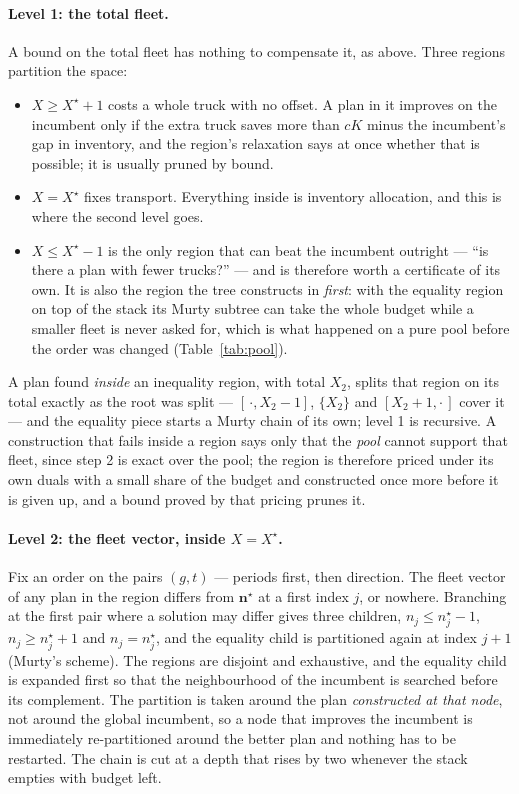 \paragraph{Level 1: the total fleet.}
A bound on the total fleet has nothing to compensate it, as above.
Three regions partition the space:
\begin{itemize}
\item $X\ge X^{\star}+1$ costs a whole truck with no offset. A plan in
  it improves on the incumbent only if the extra truck saves more than
  $cK$ minus the incumbent's gap in inventory, and the region's
  relaxation says at once whether that is possible; it is usually
  pruned by bound.
\item $X=X^{\star}$ fixes transport. Everything inside is inventory
  allocation, and this is where the second level goes.
\item $X\le X^{\star}-1$ is the only region that can beat the incumbent
  outright --- ``is there a plan with fewer trucks?'' --- and is
  therefore worth a certificate of its own. It is also the region the
  tree constructs in \emph{first}: with the equality region on top of
  the stack its Murty subtree can take the whole budget while a smaller
  fleet is never asked for, which is what happened on a pure pool
  before the order was changed (Table~\ref{tab:pool}).
\end{itemize}
A plan found \emph{inside} an inequality region, with total $X_{2}$,
splits that region on its total exactly as the root was split ---
$[\,\cdot,X_{2}-1]$, $\{X_{2}\}$ and $[X_{2}+1,\cdot\,]$ cover it ---
and the equality piece starts a Murty chain of its own; level 1 is
recursive. A construction that fails inside a region says only that the
\emph{pool} cannot support that fleet, since step 2 is exact over the
pool; the region is therefore priced under its own duals with a small
share of the budget and constructed once more before it is given up,
and a bound proved by that pricing prunes it.

\paragraph{Level 2: the fleet vector, inside $X=X^{\star}$.}
Fix an order on the pairs $(g,t)$ --- periods first, then direction. The
fleet vector of any plan in the region differs from $\mathbf{n}^{\star}$
at a first index $j$, or nowhere. Branching at the first pair where a
solution may differ gives three children, $n_{j}\le n^{\star}_{j}-1$,
$n_{j}\ge n^{\star}_{j}+1$ and $n_{j}=n^{\star}_{j}$, and the equality
child is partitioned again at index $j+1$ (Murty's scheme). The regions
are disjoint and exhaustive, and the equality child is expanded first so
that the neighbourhood of the incumbent is searched before its
complement. The partition is taken around the plan \emph{constructed at
that node}, not around the global incumbent, so a node that improves the
incumbent is immediately re-partitioned around the better plan and
nothing has to be restarted. The chain is cut at a depth that rises by
two whenever the stack empties with budget left.

